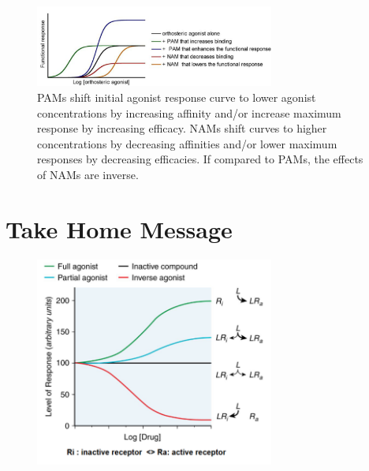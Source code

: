 \documentclass{book}
\begin{document}
\begin{figure}[H]
    \includegraphics[width=0.7\textwidth, center]{images/image23.png}
    \caption{PAMs shift initial agonist response curve to lower agonist concentrations by increasing affinity and/or increase maximum response by increasing efficacy. NAMs shift curves to higher concentrations by decreasing affinities and/or lower maximum responses by decreasing efficacies. If compared to PAMs, the effects of NAMs are inverse.}
\end{figure}

\section{Take Home Message}

\begin{figure}[H]
    \includegraphics[width=0.7\textwidth, center]{images/image24.png}
    \caption{}

\end{figure}
\printbibliography
\end{document}
